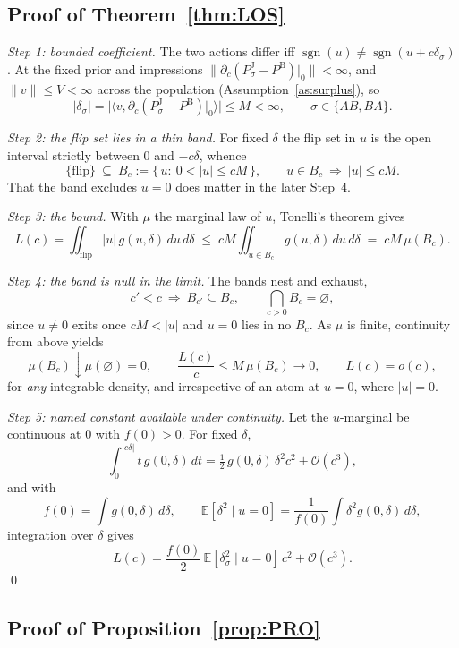 \documentclass[a4paper,fleqn]{cas-sc}
\theoremstyle{remark}
\theoremstyle{definition}
\newcommand{\PB}{P^{\mathrm{B}}}
\newcommand{\PJ}{P^{\mathrm{J}}}
\newcommand{\sgn}{\operatorname{sgn}}
\newcommand{\E}{\mathbb{E}}
\newcommand{\bigO}{\mathcal{O}}
\newcommand{\vv}{v}
\begin{document}
\subsection{Proof of Theorem~\ref{thm:LOS}}

\emph{Step 1: bounded coefficient.} The two actions differ iff
$\sgn(u)\neq\sgn(u+c\delta_\sigma)$. At the fixed prior and impressions
$\|\partial_c(\PJ_\sigma-\PB)|_{0}\|<\infty$, and $\|\vv\|\le V<\infty$ across the population
(Assumption~\ref{as:surplus}), so
\[
  |\delta_\sigma|
   =\bigl|\langle\vv,\partial_c(\PJ_\sigma-\PB)|_{0}\rangle\bigr|
   \le M<\infty,
  \qquad \sigma\in\{AB,BA\}.
\]

\emph{Step 2: the flip set lies in a thin band.} For fixed $\delta$ the flip set in $u$ is the
open interval strictly between $0$ and $-c\delta$, whence
\[
  \{\mathrm{flip}\}\ \subseteq\ B_c:=\{\,u:\ 0<|u|\le cM\,\},
  \qquad
  u\in B_c\ \Longrightarrow\ |u|\le cM.
\]
That the band excludes $u=0$ does matter in the later Step~4.

\emph{Step 3: the bound.} With $\mu$ the marginal law of $u$, Tonelli's theorem
\citep[Corollary~1.7.23]{tao2011measure} gives
\[
  L(c)=\iint_{\mathrm{flip}}|u|\,g(u,\delta)\,du\,d\delta
   \;\le\; cM\!\iint_{u\in B_c}\! g(u,\delta)\,du\,d\delta
   \;=\; cM\,\mu(B_c).
\]

\emph{Step 4: the band is null in the limit.} The bands nest and exhaust,
\[
  c'<c\ \Longrightarrow\ B_{c'}\subseteq B_c,
  \qquad
  \bigcap_{c>0}B_c=\varnothing,
\]
since $u\neq0$ exits once $cM<|u|$ and $u=0$ lies in no $B_c$. As $\mu$ is finite, continuity
from above \citep[\S1.4]{tao2011measure} yields
\[
  \mu(B_c)\downarrow\mu(\varnothing)=0,
  \qquad
  \frac{L(c)}{c}\le M\,\mu(B_c)\longrightarrow0,
  \qquad
  L(c)=o(c),
\]
for \emph{any} integrable density, and irrespective of an atom at $u=0$, where $|u|=0$.

\emph{Step 5: named constant available under continuity.} Let the $u$-marginal be continuous at $0$ with
$f(0)>0$. For fixed $\delta$,
\[
  \int_0^{|c\delta|}t\,g(0,\delta)\,dt=\tfrac{1}{2}\,g(0,\delta)\,\delta^{2}c^{2}+\bigO(c^3),
\]
and with
\[
  f(0)=\int g(0,\delta)\,d\delta,
  \qquad
  \E[\delta^2\mid u=0]=\frac{1}{f(0)}\int\delta^2 g(0,\delta)\,d\delta,
\]
integration over $\delta$ gives
\[
  L(c)=\frac{f(0)}{2}\,\E[\delta_\sigma^2\mid u=0]\,c^{2}+\bigO(c^3).
\]
\qed

\subsection{Proof of Proposition~\ref{prop:PRO}}
\end{document}
